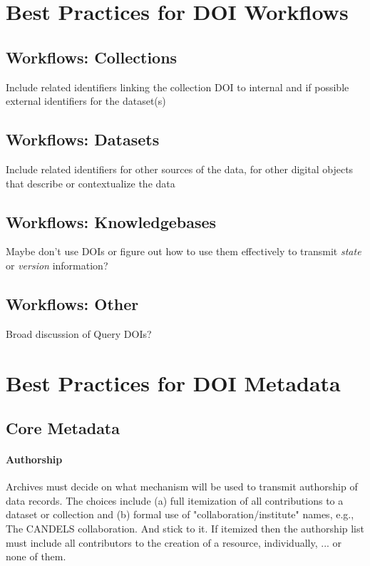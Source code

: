 \documentclass[11pt,a4paper]{ivoa}
\begin{document}
\section{Best Practices for DOI Workflows}
\label{sec:bpwork}
\subsection{Workflows: Collections}
Include related identifiers linking the collection DOI to internal and if possible external identifiers for the dataset(s)

\subsection{Workflows: Datasets}
Include related identifiers for other sources of the data, for other digital objects that describe or contextualize the data

\subsection{Workflows: Knowledgebases}
Maybe don't use DOIs or figure out how to use them effectively to transmit \textit{state} or \textit{version} information?

\subsection{Workflows: Other}
Broad discussion of Query DOIs? 

\section{Best Practices for DOI Metadata}
\label{sec:bpmeta}
\subsection{Core Metadata}
\label{sec:bpmeta:core}

\paragraph{Authorship} 
Archives must decide on what mechanism will be used to transmit authorship of data records. The choices include (a) full itemization of all contributions to a dataset or collection and (b) formal use of  "collaboration/institute" names, e.g., The CANDELS collaboration. And stick to it.
If itemized then the authorship list must include all contributors to the creation of a resource, individually, ... or none of them.
\end{document}
